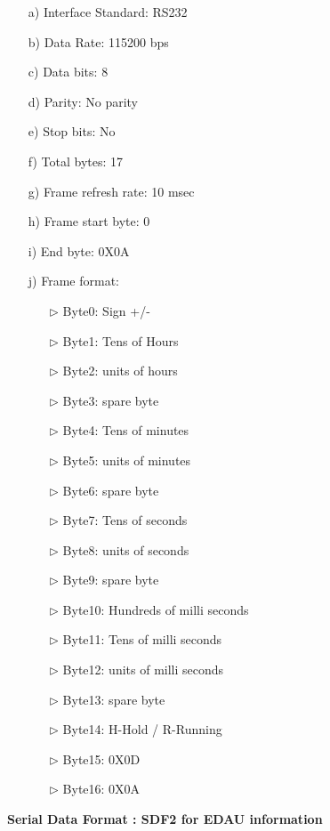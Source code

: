 \begin{enumerate}
	\item [a)] Interface Standard: RS232
	\item [b)] Data Rate:   115200 bps
	\item [c)] Data bits: 8
	\item [d)] Parity: No parity
	\item [e)] Stop bits: No
	\item [f)] Total bytes: 17
	\item [g)] Frame refresh rate: 10 msec
	\item [h)] Frame start byte: 0
	\item [i)] End byte: 0X0A
	\item [j)] Frame format: 
		\begin{enumerate}
			\item [$\rhd$] Byte0: Sign +/-
			\item [$\rhd$] Byte1: Tens of Hours
			\item [$\rhd$] Byte2: units of hours
			\item [$\rhd$] Byte3: spare byte
			\item [$\rhd$] Byte4: Tens of minutes
			\item [$\rhd$] Byte5: units of minutes
			\item [$\rhd$] Byte6: spare byte
			\item [$\rhd$] Byte7: Tens of seconds
			\item [$\rhd$] Byte8: units of seconds
			\item [$\rhd$] Byte9: spare byte
			\item [$\rhd$] Byte10: Hundreds of milli seconds
			\item [$\rhd$] Byte11: Tens of milli seconds
			\item [$\rhd$] Byte12: units of milli seconds
			\item [$\rhd$] Byte13: spare byte
			\item [$\rhd$] Byte14: H-Hold / R-Running
			\item [$\rhd$] Byte15: 0X0D
			\item [$\rhd$] Byte16: 0X0A
		\end{enumerate}
\end{enumerate}
\textbf{Serial Data Format : SDF2 for EDAU information}
